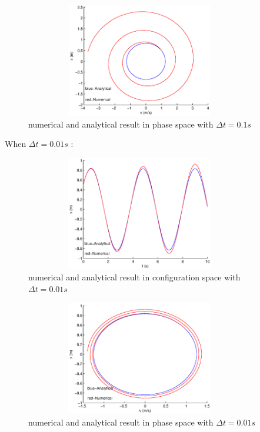 \documentclass{article}
\begin{document}
\newpage
\begin{figure}[!htb]
	\begin{center}
		\includegraphics[height=5cm,width=10cm]{Problem2_1phase}
	\end{center}
	\caption{numerical and analytical result in phase space with $\Delta t=0.1s$}
\end{figure}
\noindent When $\Delta t=0.01s$ :
\begin{figure}[!htb]
	\begin{center}
		\includegraphics[height=5cm,width=10cm]{Problem2_2configuration}
	\end{center}
	\caption{numerical and analytical result in configuration space with $\Delta t=0.01s$}
\end{figure}
\begin{figure}[!htb]
	\begin{center}
		\includegraphics[height=5cm,width=10cm]{Problem2_2phase}
	\end{center}
	\caption{numerical and analytical result in phase space with $\Delta t=0.01s$}
\end{figure}
\end{document}
